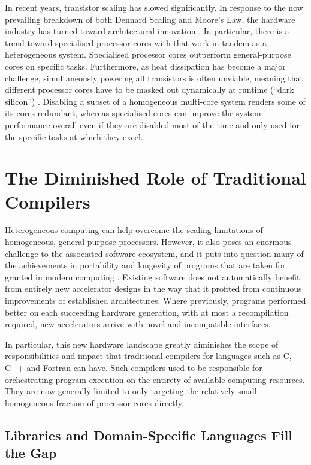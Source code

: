     In recent years, transistor scaling has slowed significantly.
    In response to the now prevailing breakdown of both Dennard Scaling and
    Moore's Law, the hardware industry has turned toward architectural
    innovation \citep{7878935}.
    In particular, there is a trend toward specialised processor cores with
    that work in tandem as a heterogeneous system.
    Specialised processor cores outperform general-purpose cores on specific
    tasks.
    Furthermore, as heat dissipation has become a major challenge,
    simultaneously powering all transistors is often unviable, meaning that
    different processor cores have to be masked out dynamically at runtime
    (``dark silicon'') \citep{6307773}.
    Disabling a subset of a homogeneous multi-core system renders some of its
    cores redundant, whereas specialised cores can improve the system
    performance overall even if they are disabled most of the time and only
    used for the specific tasks at which they excel.

\section{The Diminished Role of Traditional Compilers}

    Heterogeneous computing can help overcome the scaling limitations of
    homogeneous, general-purpose processors.
    However, it also poses an enormous challenge to the associated software
    ecosystem, and it puts into question many of the achievements in portability
    and longevity of programs that are taken for granted in modern computing
    \citep{8719512}.
    Existing software does not automatically benefit from entirely new
    accelerator designs in the way that it profited from continuous
    improvements of established architectures.
    Where previously, programs performed better on each succeeding hardware
    generation, with at most a recompilation required, new accelerators arrive
    with novel and incompatible interfaces.

    In particular, this new hardware landscape greatly diminishes the scope of
    responsibilities and impact that traditional compilers for languages such as
    C, C++ and Fortran can have.
    Such compilers used to be responsible for orchestrating
    program execution on the entirety of available computing resources.
    They are now generally limited to only targeting the relatively small
    homogeneous fraction of processor cores directly.

\subsection{Libraries and Domain-Specific Languages Fill the Gap}

